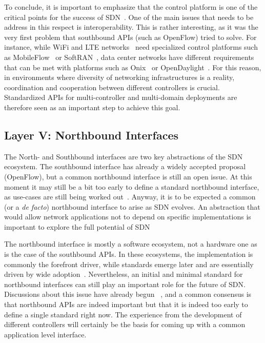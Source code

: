 To conclude, it is important to emphasize that the control platform is one of the critical points for 
the success of SDN~\cite{casemore2012-1}.
One of the main issues that needs to be address in this respect is interoperability. 
This is rather interesting, as it was the very first problem that southbound APIs (such as OpenFlow) tried to solve.
For instance, while WiFi and LTE networks~\cite{Kwan2010survey} need specialized control platforms such as MobileFlow~\cite{pentikousis2013} or SoftRAN~\cite{gudipati2013}, 
data center networks have different requirements that can be met with platforms such as Onix~\cite{koponen-1} or OpenDaylight~\cite{opendaylight2013}. 
For this reason, in environments where diversity of networking infrastructures is a reality, coordination and cooperation between different controllers is crucial. 
Standardized APIs for multi-controller and multi-domain deployments are therefore seen as an important step to achieve this goal.

\subsection{Layer V: Northbound Interfaces}
\label{sec:layer-north}

The North- and Southbound interfaces are two key abstractions of the SDN ecosystem. 
The southbound interface has already a widely accepted proposal (OpenFlow), but a common northbound 
interface is still an open issue.
At this moment it may still be a bit too early to define a standard northbound interface, as use-cases are still being worked out~\cite{dix2013}.
Anyway, it is to be expected a common (or a \emph{de facto}) northbound interface to arise as SDN evolves.
An abstraction that would allow network applications not to depend on specific implementations is important to explore the full potential of SDN 

The northbound interface is mostly a software ecosystem, not a hardware one as is the case of the southbound APIs.
In these ecosystems, the implementation is commonly the forefront driver, while standards emerge later and 
are essentially driven by wide adoption~\cite{guis2012}. Nevertheless, an initial and 
minimal standard for northbound interfaces can still play an important role for the future of SDN. 
Discussions about this issue have already begun ~\cite{dix2013,guis2012,salisbury2012-1,ferro2012,casemore2012,pepelnjak2012,johnson2012,little2013-1}, and a common consensus is that northbound APIs are indeed important but that it is indeed too early to define a single standard right now.
The experience from the development of different controllers will certainly be the basis for coming up with a common application level interface.

